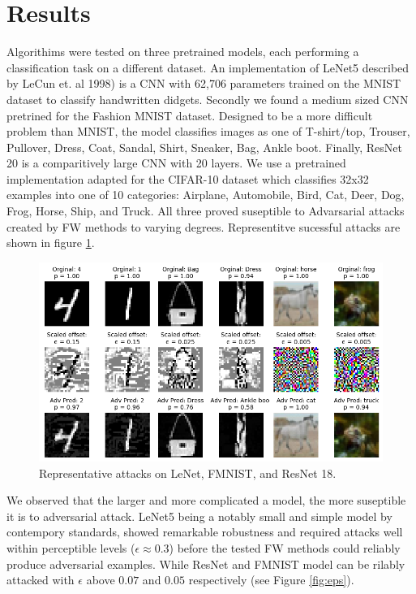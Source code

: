 \documentclass{article}
\begin{document}
\section{Results}
Algorithims were tested on three pretrained models, each performing a classification task on a different dataset. An implementation of LeNet5 described by LeCun et. al 1998) is a CNN with 62,706 parameters trained on the MNIST dataset to classify handwritten didgets. 
Secondly we found a medium sized CNN pretrined for the Fashion MNIST dataset. Designed to be a more difficult problem than MNIST, the model classifies images as one of T-shirt/top, Trouser, Pullover, Dress, Coat, Sandal, Shirt, Sneaker, Bag, Ankle boot. 
Finally, ResNet 20 is a comparitively large CNN with 20 layers. We use a pretrained implementation adapted for the CIFAR-10 dataset which classifies 32x32 examples into one of 10 categories: Airplane, Automobile, Bird, Cat, Deer, Dog, Frog, Horse, Ship, and Truck. All three proved suseptible to Advarsarial attacks created by FW methods to varying degrees. Representitve sucessful attacks are shown in figure \ref{fig:adv_ex}.

\begin{figure}[H]
    \centering
    \includegraphics[width=\textwidth]{plots/adv_ex.png}
    \caption{Representative attacks on LeNet, FMNIST, and ResNet 18.}
    \label{fig:adv_ex}
\end{figure}

We observed that the larger and more complicated a model, the more suseptible it is to adversarial attack. 
LeNet5 being a notably small and simple model by contempory standards, showed remarkable robustness and required attacks well within perceptible levels ($\epsilon \approx 0.3$) before the tested FW methods could reliably produce adversarial examples. While ResNet and FMNIST model can be rilably attacked with $\epsilon$ above $0.07$ and $0.05$ respectively (see Figure \ref{fig:eps}).
\end{document}
